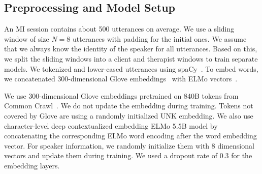 
\subsection{Preprocessing and Model Setup}
\label{ssec:snt:exp_setup}


An MI session contains about 500 utterances on average. We use a
sliding window of size $N=8$ utterances with padding for the initial
ones. We assume that we always know the identity of the speaker for
all utterances. Based on this, we split the sliding windows into a
client and therapist windows to train separate models.
%
We tokenized and lower-cased utterances using
spaCy~\cite{spacy2}. To embed words, we concatenated 300-dimensional
Glove embeddings~\cite{pennington2014glove} with ELMo
vectors~\cite{Peters:2018}.

We use 300-dimensional Glove embeddings pretrained on 840B tokens
from Common Crawl~\cite{pennington2014glove}. We do not update the
embedding during training. Tokens not covered by Glove are using a
randomly initialized UNK embedding. We also use character-level deep
contextualized embedding ELMo 5.5B model by concatenating the
corresponding ELMo word encoding after the word embedding vector. For
speaker information, we randomly initialize them with 8 dimensional
vectors and update them during training. We used a dropout rate of 0.3
for the embedding layers.

